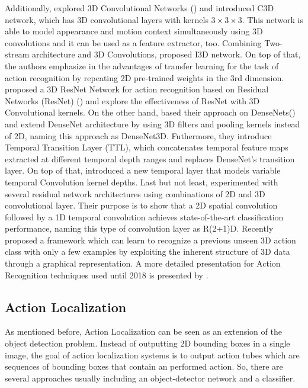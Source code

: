 Additionally, \cite{Tran2014LearningSF} explored 3D Convolutional Networks (\cite{pmid:22392705}) and introduced C3D network, which  has
3D convolutional layers with kernels $ 3 \times 3 \times 3$.
This network is able to  model appearance and motion context simultaneously using 3D convolutions and it can be used as a feature extractor, too.
Combining Two-stream architecture and 3D Convolutions, \cite{DBLP:journals/corr/CarreiraZ17} proposed
I3D network. On top of that, the authors emphasize in the advantages of transfer learning for the task of action recognition by repeating 2D pre-trained weights
in the 3rd dimension. \cite{DBLP:journals/corr/abs-1708-07632} proposed a 3D ResNet Network for action recognition based on Residual Networks (ResNet)
(\cite{DBLP:journals/corr/HeZRS15}) and explore the effectiveness of ResNet with 3D Convolutional kernels.
On the other hand, \cite{DBLP:journals/corr/abs-1711-08200}  based their approach on DenseNets(\cite{DBLP:journals/corr/HuangLW16a}) and extend
DenseNet architecture by using 3D filters and pooling kernels instead of 2D, naming this approach as DenseNet3D. Futhermore, they introduce
Temporal Transition Layer (TTL), which concatenates temporal feature maps extracted at different temporal depth ranges and replaces DenseNet's
transition layer. On top of that, \cite{DBLP:DibaFSKAYG18} introduced  a new temporal layer that models variable  temporal Convolution kernel depths.
Last but not least, \cite{DBLP:journals/corr/abs-1711-11248} experimented with several residual network architectures using combinations of 2D and 3D convolutional layer. Their purpose is
to show that a 2D spatial convolution followed by a 1D temporal convolution achieves state-of-the-art classification performance, naming
this type of convolution layer as R(2+1)D. 
Recently \cite{Guo_2018_ECCV} proposed a framework which can learn to recognize a previous unseen 3D action class with only a few examples
by exploiting the inherent structure of 3D data through a graphical representation. A more detailed presentation for Action Recognition techniques used until 2018 is presented by
\cite{DBLP:journals/corr/abs-1806-11230}.

\subsection{Action Localization}

As mentioned before, Action Localization can be seen as an extension of the object detection problem. Instead of outputting 2D bounding
boxes in a single image, the goal of action localization systems is to output action tubes which are sequences of bounding boxes that
contain an performed action. So, there are several approaches usually including an object-detector network  and a classifier. \par


